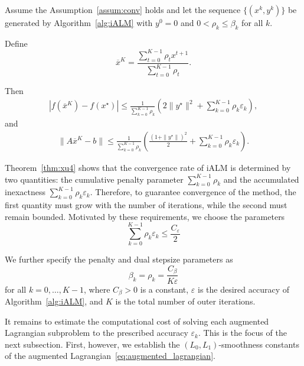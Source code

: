 \documentclass[runningheads]{llncs}
\begin{document}
	\begin{theorem}[[\cite{xu2021iteration}, Ergodic convergence rate of iALM]
		\label{thm:xu4}
		Assume the Assumption~\ref{assum:conv} holds and let the sequence $\{(x^k,y^k)\}$ be generated by Algorithm~\ref{alg:iALM} with $y^0=0$ and $0<\rho_k\leq \beta_k$ for all $k$.
		
		Define
		\begin{equation}\label{ergodic_point_def}
			\overline{x}^{K}
			=
			\frac{\sum_{t=0}^{K-1}\rho_t x^{t+1}}
			{\sum_{t=0}^{K-1}\rho_t}.
		\end{equation}
		
		Then
		\begin{align}
			\left|
			f(\overline{x}^{K})-f(x^\star)
			\right|
			\leq
			\frac{1}{\sum_{k=0}^{K-1}\rho_k}
			\left(
			2\|y^\star\|^2
			+
			\sum_{k=0}^{K-1}\rho_k\varepsilon_k
			\right),
			\label{eq:ergodic_obj}
		\end{align}
		and
		\begin{align}
			\|A\overline{x}^{K}-b\|
			\leq
			\frac{1}{\sum_{k=0}^{K-1}\rho_k} 
			\left( 
			\frac{(1+\|y^\star\|)^2}{2}
			+
			\sum_{k=0}^{K-1}\rho_k\varepsilon_k 
			\right).
			\label{eq:ergodic_feas}
		\end{align}
	\end{theorem}
	
	Theorem~\ref{thm:xu4} shows that the convergence rate of iALM is determined by two quantities: the cumulative penalty parameter $\sum_{k=0}^{K-1}\rho_k$ and the accumulated inexactness $\sum_{k=0}^{K-1}\rho_k\varepsilon_k$. Therefore, to guarantee convergence of the method, the first quantity must grow with the number of iterations, while the second must remain bounded. Motivated by these requirements, we choose the parameters
	\begin{equation}\label{rho_epsilon_pick}
		\boxed{
			\sum_{k=0}^{K-1} \rho_k \varepsilon_k
			\leq
			\frac{C_\varepsilon}{2}
		}
	\end{equation}
	
	We further specify the penalty and dual stepsize parameters as
	\begin{equation}\label{beta_rho_pick}
		\boxed{
			\beta_k
			=
			\rho_k
			=
			\frac{C_\beta}{K\varepsilon}
		}
	\end{equation}
	for all $k=0,\ldots,K-1$, where $C_\beta>0$ is a constant, $\varepsilon$ is the desired accuracy of Algorithm~\ref{alg:iALM}, and $K$ is the total number of outer iterations.
	
	It remains to estimate the computational cost of solving each augmented Lagrangian subproblem to the prescribed accuracy $\varepsilon_k$. This is the focus of the next subsection. First, however, we establish the $(L_0,L_1)$-smoothness constants of the augmented Lagrangian~\eqref{eq:augmented_lagrangian}.
	
\end{document}
